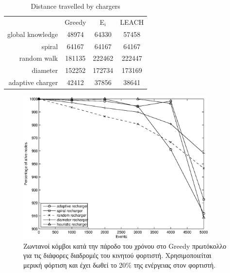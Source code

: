 \begin{table}[H]
\begin{tabular}{r|c|c|c|}
& Greedy & E$_i$ & LEACH\\\cline{2-4}\cline{2-4}
global knowledge & 48974 & 64330 & 57458\\\cline{2-4}
spiral & 64167 & 64167 & 64167\\\cline{2-4}
random walk & 181135 & 222462 & 222447 \\\cline{2-4}
diameter & 152252 & 172734 & 173169\\\cline{2-4}
adaptive charger & 42412 & 37856 & 38641\\\cline{2-4}
\end{tabular}
\caption{Distance travelled by chargers}
\label{tab:dist}
\end{table}

\begin{figure}[H]
  \centering
  \includegraphics[width=0.9\textwidth]{experiments/classic/4.ourVSnaive/alive_nodes_greedy_rc_per_our-spiral-random-diameter-heuristic.eps}
  \caption{Ζωντανοί κόμβοι κατά την πάροδο του χρόνου στο Greedy πρωτόκολλο για τις διάφορες διαδρομές του κινητού φορτιστή. Χρησιμοποιείται μερική φόρτιση και έχει
δωθεί το 20\% της ενέργειας στον φορτιστή.}
  \label{fig:4exp_1_1}
\end{figure}

